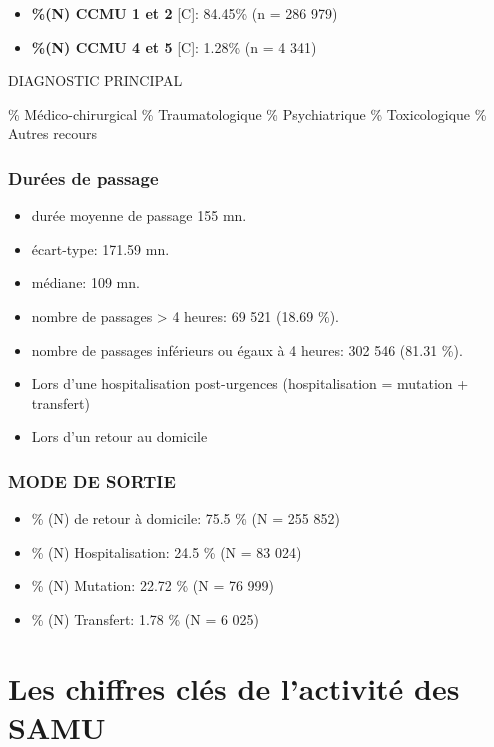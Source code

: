 \documentclass[]{article}
\begin{document}
\begin{itemize}
\itemsep1pt\parskip0pt
\item
  \textbf{\%(N) CCMU 1 et 2} {[}C{]}: 84.45\% (n = 286 979)
\item
  \textbf{\%(N) CCMU 4 et 5} {[}C{]}: 1.28\% (n = 4 341)
\end{itemize}

DIAGNOSTIC PRINCIPAL

\% Médico-chirurgical \% Traumatologique \% Psychiatrique \%
Toxicologique \% Autres recours

\subsubsection{Durées de passage}\label{durees-de-passage}

\begin{itemize}
\item
  durée moyenne de passage 155 mn.
\item
  écart-type: 171.59 mn.
\item
  médiane: 109 mn.
\item
  nombre de passages \textgreater{} 4 heures: 69 521 (18.69 \%).
\item
  nombre de passages inférieurs ou égaux à 4 heures: 302 546 (81.31 \%).
\item
  Lors d'une hospitalisation post-urgences (hospitalisation = mutation +
  transfert)
\item
  Lors d'un retour au domicile
\end{itemize}

\subsubsection{MODE DE SORTIE}\label{mode-de-sortie}

\begin{itemize}
\itemsep1pt\parskip0pt
\item
  \% (N) de retour à domicile: 75.5 \% (N = 255 852)
\item
  \% (N) Hospitalisation: 24.5 \% (N = 83 024)
\item
  \% (N) Mutation: 22.72 \% (N = 76 999)
\item
  \% (N) Transfert: 1.78 \% (N = 6 025)
\end{itemize}

\section{Les chiffres clés de l'activité des
SAMU}\label{les-chiffres-cles-de-lactivite-des-samu}
\end{document}
